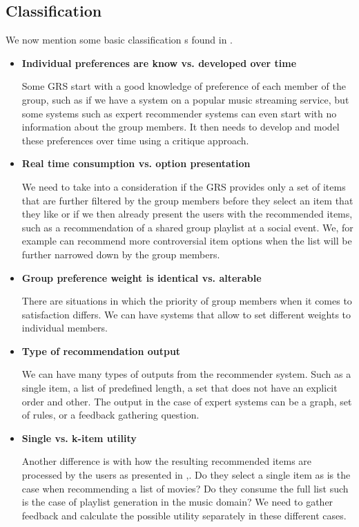 \subsection{Classification}
We now mention some basic classification s found in \cite{masthoff_2011_group_rec_systems}.
\begin{itemize}
    \item \textbf{Individual preferences are know vs. developed over time}
    
    Some GRS start with a good knowledge of preference of each member of the group, such as if we have a system on a popular music streaming service, but some systems such as expert recommender systems can even start with no information about the group members. It then needs to develop and model these preferences over time using a critique approach.
    
    \item \textbf{Real time consumption vs. option presentation}
    
    We need to take into a consideration if the GRS provides only a set of items that are further filtered by the group members before they select an item that they like or if we then already present the users with the recommended items, such as a recommendation of a shared group playlist at a social event. We, for example can recommend more controversial item options when the list will be further narrowed down by the group members.
    
    
    \item \textbf{Group preference weight is identical vs. alterable}
    
    There are situations in which the priority of group members when it comes to satisfaction differs. We can have systems that allow to set different weights to individual members.
    
    \item \textbf{Type of recommendation output}
    
    We can have many types of outputs from the recommender system. Such as a single item, a list of predefined length, a set that does not have an explicit order and other. The output in the case of expert systems can be a graph, set of rules, or a feedback gathering question.
    
    \item \textbf{Single vs. k-item utility}
    
    Another difference is with how the resulting recommended items are processed by the users as presented in \cite{xiao_2017_fairness_aware_g_rec},\cite{connor_2001_polylens_rec_for_groups}. Do they select a single item as is the case when recommending a list of movies? Do they consume the full list such is the case of playlist generation in the music domain? We need to gather feedback and calculate the possible utility separately in these different cases.
\end{itemize}


